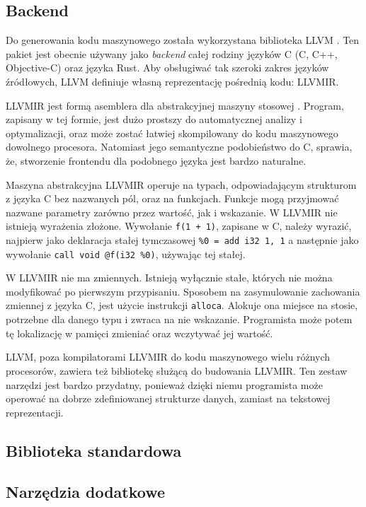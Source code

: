 \subsection{Backend}
\label{implementation:backend}
Do generowania kodu maszynowego została wykorzystana biblioteka LLVM \cite{Lattner:MSThesis02}.
Ten pakiet jest obecnie używany jako \emph{backend} całej rodziny języków C (C, C++, Objective-C) oraz języka Rust.
Aby obsługiwać tak szeroki zakres języków źródłowych, LLVM definiuje własną reprezentację pośrednią kodu: LLVMIR.

LLVMIR jest formą asemblera dla abstrakcyjnej maszyny stosowej \cite{llvmir}.
Program, zapisany w tej formie, jest dużo prostszy do automatycznej analizy i optymalizacji, oraz może zostać łatwiej skompilowany do kodu maszynowego dowolnego procesora.
Natomiast jego semantyczne podobieństwo do C, sprawia, że, stworzenie frontendu dla podobnego języka jest bardzo naturalne.

Maszyna abstrakcyjna LLVMIR operuje na typach, odpowiadającym strukturom z języka C bez nazwanych pól, oraz na funkcjach.
Funkcje mogą przyjmować nazwane parametry zarówno przez wartość, jak i wskazanie.
W LLVMIR nie istnieją wyrażenia złożone.
Wywołanie \lstinline{f(1 + 1)}, zapisane w C, należy wyrazić, najpierw jako deklaracja stałej tymczasowej \lstinline{%0 = add i32 1, 1} a następnie jako wywołanie \lstinline{call void @f(i32 %0)}, używając tej stałej.

W LLVMIR nie ma zmiennych.
Istnieją wyłącznie stałe, których nie można modyfikować po pierwszym przypisaniu.
Sposobem na zasymulowanie zachowania zmiennej z języka C, jest użycie instrukcji \lstinline{alloca}.
Alokuje ona miejsce na stosie, potrzebne dla danego typu i zwraca na nie wskazanie.
Programista może potem tę lokalizację w pamięci zmieniać oraz wczytywać jej wartość.

LLVM, poza kompilatorami LLVMIR do kodu maszynowego wielu różnych procesorów, zawiera też bibliotekę służącą do budowania LLVMIR.
Ten zestaw narzędzi jest bardzo przydatny, ponieważ dzięki niemu programista może operować na dobrze zdefiniowanej strukturze danych, zamiast na tekstowej reprezentacji.

\subsection{Biblioteka standardowa}

\subsection{Narzędzia dodatkowe}

